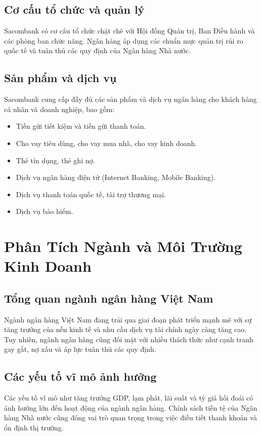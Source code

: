 \documentclass[11pt]{article}
\begin{document}
\subsection{Cơ cấu tổ chức và quản lý}
Sacombank có cơ cấu tổ chức chặt chẽ với Hội đồng Quản trị, Ban Điều hành và các phòng ban chức năng. Ngân hàng áp dụng các chuẩn mực quản trị rủi ro quốc tế và tuân thủ các quy định của Ngân hàng Nhà nước.

\subsection{Sản phẩm và dịch vụ}
Sacombank cung cấp đầy đủ các sản phẩm và dịch vụ ngân hàng cho khách hàng cá nhân và doanh nghiệp, bao gồm:
\begin{itemize}
    \item Tiền gửi tiết kiệm và tiền gửi thanh toán.
    \item Cho vay tiêu dùng, cho vay mua nhà, cho vay kinh doanh.
    \item Thẻ tín dụng, thẻ ghi nợ.
    \item Dịch vụ ngân hàng điện tử (Internet Banking, Mobile Banking).
    \item Dịch vụ thanh toán quốc tế, tài trợ thương mại.
    \item Dịch vụ bảo hiểm.
\end{itemize}

\section{Phân Tích Ngành và Môi Trường Kinh Doanh}

\subsection{Tổng quan ngành ngân hàng Việt Nam}
Ngành ngân hàng Việt Nam đang trải qua giai đoạn phát triển mạnh mẽ với sự tăng trưởng của nền kinh tế và nhu cầu dịch vụ tài chính ngày càng tăng cao. Tuy nhiên, ngành ngân hàng cũng đối mặt với nhiều thách thức như cạnh tranh gay gắt, nợ xấu và áp lực tuân thủ các quy định.

\subsection{Các yếu tố vĩ mô ảnh hưởng}
Các yếu tố vĩ mô như tăng trưởng GDP, lạm phát, lãi suất và tỷ giá hối đoái có ảnh hưởng lớn đến hoạt động của ngành ngân hàng. Chính sách tiền tệ của Ngân hàng Nhà nước cũng đóng vai trò quan trọng trong việc điều tiết thanh khoản và ổn định thị trường.
\end{document}
